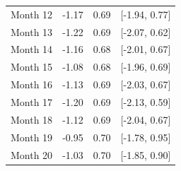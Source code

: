 \begin{tabular}{lrrc}
        Month 12 & -1.17 & 0.69 & [-1.94, 0.77] \\
        Month 13 & -1.22 & 0.69 & [-2.07, 0.62] \\
        Month 14 & -1.16 & 0.68 & [-2.01, 0.67] \\
        Month 15 & -1.08 & 0.68 & [-1.96, 0.69] \\
        Month 16 & -1.13 & 0.69 & [-2.03, 0.67] \\
        Month 17 & -1.20 & 0.69 & [-2.13, 0.59] \\
        Month 18 & -1.12 & 0.69 & [-2.04, 0.67] \\
        Month 19 & -0.95 & 0.70 & [-1.78, 0.95] \\
        Month 20 & -1.03 & 0.70 & [-1.85, 0.90] \\
        \bottomrule
    \end{tabular}